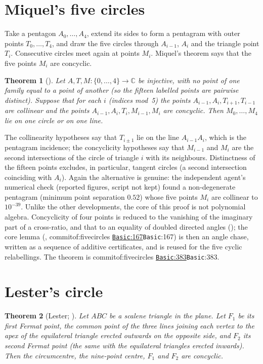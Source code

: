 \documentclass[11pt]{article}
\newtheorem{theorem}{Theorem}
\theoremstyle{definition}
\theoremstyle{remark}
\newcommand{\CC}{\mathbb{C}}
\newcommand{\commitof}[1]{\csname commitof:#1\endcsname}
\newcommand{\repo}[1]{https://github.com/jpbald93/#1}
\newcommand{\src}[4]{\ifcsname commitof:#1\endcsname
  \href{\repo{#1}/blob/\commitof{#1}/#2/#3.lean\#L#4}{\texttt{#3}:#4}\else\texttt{#3}:#4\fi}
\begin{document}
\section{Miquel's five circles}\label{sec:five}

Take a pentagon $A_0,\dots,A_4$, extend its sides to form a pentagram with outer points
$T_0,\dots,T_4$, and draw the five circles through $A_{i-1}$, $A_i$ and the triangle point $T_i$.
Consecutive circles meet again at points $M_i$. Miquel's theorem \cite{miquel1838} says that the five
points $M_i$ are concyclic.

\begin{theorem}[]\label{thm:five}
Let $A,T,M:\{0,\dots,4\}\to\CC$ be injective, with no point of one family equal to a point of
another (so the fifteen labelled points are pairwise distinct). Suppose that for each $i$ (indices mod~5) the points $A_{i-1},A_i,T_{i+1},T_{i-1}$ are
collinear and the points $A_{i-1},A_i,T_i,M_{i-1},M_i$ are concyclic. Then $M_0,\dots,M_4$ lie on one
circle or on one line.
\end{theorem}

The collinearity hypotheses say that $T_{i\pm1}$ lie on the line $A_{i-1}A_i$, which is the
pentagram incidence; the concyclicity hypotheses say that $M_{i-1}$ and $M_i$ are the second
intersections of the circle of triangle $i$ with its neighbours. Distinctness of the fifteen points
excludes, in particular, tangent circles (a second intersection coinciding with $A_i$). Again the
alternative is genuine: the independent agent's numerical check (reported figures, script not kept) found a non-degenerate pentagram (minimum point
separation $0.52$) whose five points $M_i$ are collinear to $10^{-39}$. Unlike the other developments,
the core of this proof is not polynomial algebra. Concyclicity of four points is reduced to the
vanishing of the imaginary part of a cross-ratio, and that to an equality of doubled directed angles
(); the core lemma (, \src{fivecircles}{Fivecircles}{Basic}{167})
is then an angle chase, written as a sequence of additive certificates, and is reused for the five
cyclic relabellings. The theorem is \src{fivecircles}{Fivecircles}{Basic}{383}.

\section{Lester's circle}\label{sec:lester}

\begin{theorem}[Lester; ]\label{thm:lester}
Let $ABC$ be a scalene triangle in the plane. Let $F_1$ be its first Fermat point, the common point of
the three lines joining each vertex to the apex of the equilateral triangle erected outwards on the
opposite side, and $F_2$ its second Fermat point (the same with the equilateral triangles erected
inwards). Then the circumcentre, the nine-point centre, $F_1$ and $F_2$ are concyclic.
\end{theorem}
\end{document}
